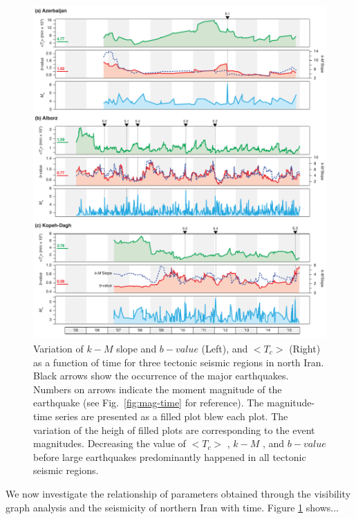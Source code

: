 \begin{figure}%
	\centering
	\includegraphics[width=\textwidth]{figures/pdf/figure-09} 
	\caption{ Variation of $k-M$ slope  and $b-value$ (Left), and $ < T_c >$ (Right) as a function of time for three tectonic seismic regions in north Iran. Black arrows show the occurrence of the major earthquakes. Numbers on arrows indicate the moment magnitude of the earthquake (see Fig.~\ref{fig:mag-time} for reference).  The magnitude-time series are presented as a filled plot blew each plot. The variation of the heigh of filled plots are corresponding to the event magnitudes. Decreasing the value of  $<T_c>$  ,  $k-M$ , and  $b-value$  before large earthquakes predominantly happened in all tectonic seismic regions.}
	\label{fig:tc}
\end{figure}

We now investigate the relationship of parameters obtained through the visibility graph analysis and the seismicity of northern Iran with time. Figure \ref{fig:tc} shows...




